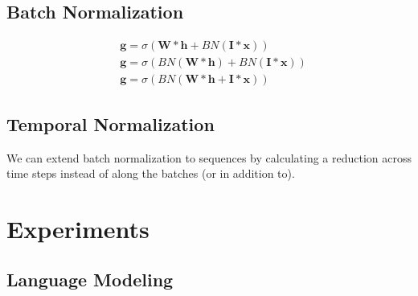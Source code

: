 \documentclass{article}
\begin{document}
\subsection{Batch Normalization}

\begin{equation}
	\begin{split}
		& \boldsymbol g = \sigma(\boldsymbol W * \boldsymbol h + BN(\boldsymbol I * \boldsymbol x)) \\
		& \boldsymbol g = \sigma(BN(\boldsymbol W * \boldsymbol h) + BN(\boldsymbol I * \boldsymbol x)) \\
		& \boldsymbol g = \sigma(BN(\boldsymbol W * \boldsymbol h + \boldsymbol I * \boldsymbol x)) \nonumber
	\end{split}
\end{equation}

\subsection{Temporal Normalization}
We can extend batch normalization to sequences by calculating a reduction across time steps instead of along the batches (or in addition to). 

\section{Experiments}

\subsection{Language Modeling}
\end{document}
